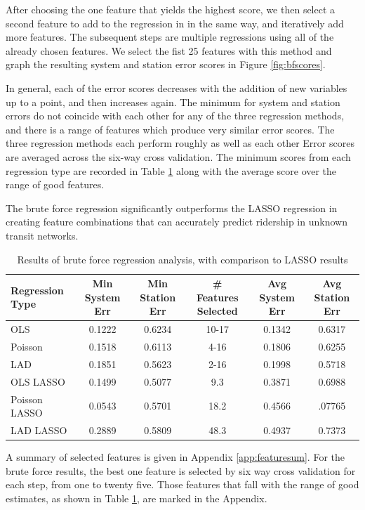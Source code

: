 \documentclass[11pt]{article}
\begin{document}
After choosing the one feature that yields the highest score, we then select a second feature to add to the regression in in the same way, and iteratively add more features. The subsequent steps are multiple regressions using all of the already chosen features. We select the fist 25 features with this method and graph the resulting system and station error scores in Figure \ref{fig:bfscores}. 

In general, each of the error scores decreases with the addition of new variables up to a point, and then increases again. The minimum for system and station errors do not coincide with each other for any of the three regression methods, and there is a range of features which produce very similar error scores. The three regression methods each perform roughly as well as each other Error scores are averaged across the six-way cross validation. The minimum scores from each regression type are recorded in Table \ref{tab:bfresults} along with the average score over the range of good features.

The brute force regression significantly outperforms the LASSO regression in creating feature combinations that can accurately predict ridership in unknown transit networks.



\begin{table}
\begingroup\fontsize{10}{15}\selectfont
\centering
\begin{tabular}{l|ccccc}
Regression Type& Min System Err&Min Station Err& \# Features Selected& Avg System Err& Avg Station Err\\
\midrule
OLS&0.1222&0.6234&10-17&0.1342&0.6317\\
Poisson&0.1518&0.6113&4-16&0.1806&0.6255\\
LAD&0.1851&0.5623&2-16&0.1998&0.5718\\
\midrule
OLS LASSO&0.1499&0.5077&9.3&0.3871&0.6988\\
Poisson LASSO&0.0543&0.5701&18.2&0.4566&.07765\\
LAD LASSO&0.2889&0.5809&48.3&0.4937&0.7373\\
\end{tabular}
\caption{Results of brute force regression analysis, with comparison to LASSO results}\label{tab:bfresults}
\endgroup
\end{table}

A summary of selected features is given in Appendix \ref{app:featuresum}. For the brute force results, the best one feature is selected by six way cross validation for each step, from one to twenty five. Those features that fall with the range of good estimates, as shown in Table \ref{tab:bfresults}, are marked in the Appendix. 
\end{document}
